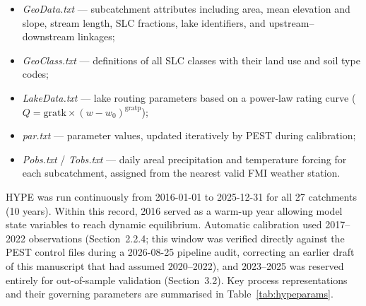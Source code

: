\documentclass[draft]{agujournal2019}
\begin{document}
\begin{itemize}
    \item \textit{GeoData.txt} — subcatchment attributes including area, mean elevation and slope, stream length, SLC fractions, lake identifiers, and upstream–downstream linkages;
    \item \textit{GeoClass.txt} — definitions of all SLC classes with their land use and soil type codes;
    \item \textit{LakeData.txt} — lake routing parameters based on a power-law rating curve ($Q = \mathrm{gratk} \times (w - w_0)^{\mathrm{gratp}}$);
    \item \textit{par.txt} — parameter values, updated iteratively by PEST during calibration;
    \item \textit{Pobs.txt} / \textit{Tobs.txt} — daily areal precipitation and temperature forcing for each subcatchment, assigned from the nearest valid FMI weather station.
\end{itemize}

HYPE was run continuously from 2016-01-01 to 2025-12-31 for all 27 catchments (10 years). Within this record, 2016 served as a warm-up year allowing model state variables to reach dynamic equilibrium. Automatic calibration used 2017--2022 observations (Section~2.2.4; this window was verified directly against the PEST control files during a 2026-08-25 pipeline audit, correcting an earlier draft of this manuscript that had assumed 2020--2022), and 2023--2025 was reserved entirely for out-of-sample validation (Section~3.2). Key process representations and their governing parameters are summarised in Table~\ref{tab:hypeparams}.
\end{document}
